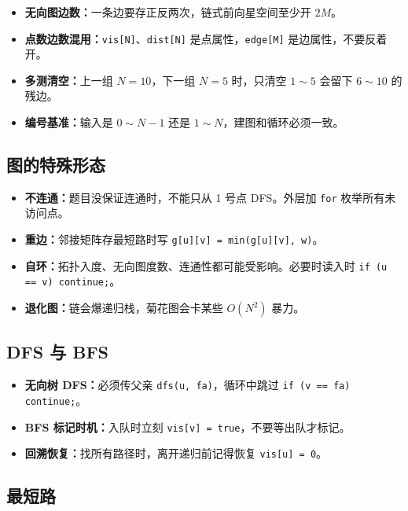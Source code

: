 \documentclass[UTF8,openany,oneside,zihao=-4]{ctexbook}
\begin{document}
\begin{itemize}
  \item \textbf{无向图边数：}一条边要存正反两次，链式前向星空间至少开 $2M$。
  \item \textbf{点数边数混用：}\lstinline!vis[N]!、\lstinline!dist[N]! 是点属性，\lstinline!edge[M]! 是边属性，不要反着开。
  \item \textbf{多测清空：}上一组 $N=10$，下一组 $N=5$ 时，只清空 $1\sim5$ 会留下 $6\sim10$ 的残边。
  \item \textbf{编号基准：}输入是 $0\sim N-1$ 还是 $1\sim N$，建图和循环必须一致。
\end{itemize}

\subsection{图的特殊形态}

\begin{itemize}
  \item \textbf{不连通：}题目没保证连通时，不能只从 1 号点 DFS。外层加 \lstinline!for! 枚举所有未访问点。
  \item \textbf{重边：}邻接矩阵存最短路时写 \lstinline!g[u][v] = min(g[u][v], w)!。
  \item \textbf{自环：}拓扑入度、无向图度数、连通性都可能受影响。必要时读入时 \lstinline!if (u == v) continue;!。
  \item \textbf{退化图：}链会爆递归栈，菊花图会卡某些 $O(N^2)$ 暴力。
\end{itemize}

\subsection{DFS 与 BFS}

\begin{itemize}
  \item \textbf{无向树 DFS：}必须传父亲 \lstinline!dfs(u, fa)!，循环中跳过 \lstinline!if (v == fa) continue;!。
  \item \textbf{BFS 标记时机：}入队时立刻 \lstinline!vis[v] = true!，不要等出队才标记。
  \item \textbf{回溯恢复：}找所有路径时，离开递归前记得恢复 \lstinline!vis[u] = 0!。
\end{itemize}

\subsection{最短路}
\end{document}

